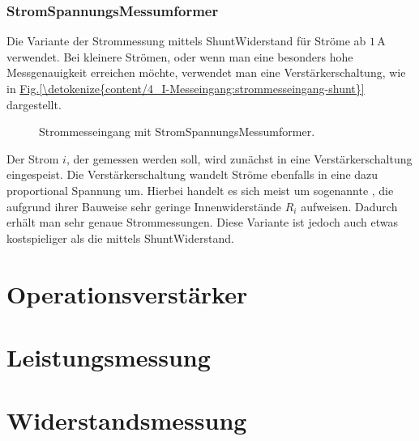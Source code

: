 \documentclass[letterpaper,10pt,english]{jupyterBook}
\let\sphinxpxdimen\pdfpxdimen\else\newdimen\sphinxpxdimen
\begin{document}
\subsubsection{Strom\sphinxhyphen{}Spannungs\sphinxhyphen{}Messumformer}
\label{\detokenize{content/4_I-Messeingang:strom-spannungs-messumformer}}
\sphinxAtStartPar
Die Variante der Strommessung mittels Shunt\sphinxhyphen{}Widerstand für Ströme ab \(1\,\mathrm A\) verwendet. Bei kleinere Strömen, oder wenn man eine besonders hohe Messgenauigkeit erreichen möchte, verwendet man eine Verstärkerschaltung, wie in \hyperref[\detokenize{content/4_I-Messeingang:strommesseingang-shunt}]{Fig.\@ \ref{\detokenize{content/4_I-Messeingang:strommesseingang-shunt}}} dargestellt.

\begin{figure}[htbp]
\centering
\capstart

\noindent\sphinxincludegraphics[width=400\sphinxpxdimen]{{strommesseingang_OP}.jpg}
\caption{Strommesseingang mit Strom\sphinxhyphen{}Spannungs\sphinxhyphen{}Messumformer.}\label{\detokenize{content/4_I-Messeingang:strommesseingang-op}}\end{figure}

\sphinxAtStartPar
Der Strom \(i\), der gemessen werden soll, wird zunächst in eine Verstärkerschaltung eingespeist. Die Verstärkerschaltung wandelt Ströme ebenfalls in eine dazu proportional Spannung um. Hierbei handelt es sich meist um sogenannte , die aufgrund ihrer Bauweise sehr geringe Innenwiderstände \(R_i\) aufweisen. Dadurch erhält man sehr genaue Strommessungen. Diese Variante ist jedoch auch etwas kostspieliger als die mittels Shunt\sphinxhyphen{}Widerstand.

\sphinxstepscope


\section{Operationsverstärker}
\label{\detokenize{content/4_OP:operationsverstarker}}\label{\detokenize{content/4_OP::doc}}
\sphinxstepscope


\section{Leistungsmessung}
\label{\detokenize{content/4_P-Messung:leistungsmessung}}\label{\detokenize{content/4_P-Messung::doc}}
\sphinxstepscope


\section{Widerstandsmessung}
\label{\detokenize{content/4_R-Messung:widerstandsmessung}}\label{\detokenize{content/4_R-Messung::doc}}
\sphinxstepscope
\end{document}
